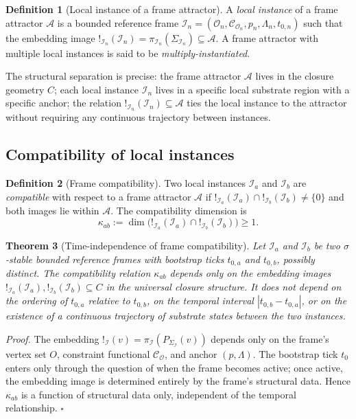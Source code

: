 \documentclass[11pt]{article}
\theoremstyle{plain}
\newtheorem{theorem}{Theorem}[section]
\theoremstyle{definition}
\newtheorem{definition}[theorem]{Definition}
\theoremstyle{remark}
\newcommand{\Ical}{\mathcal{I}}
\newcommand{\Ocal}{\mathcal{O}}
\newcommand{\Ccal}{\mathcal{C}}
\begin{document}
\begin{definition}[Local instance of a frame attractor]\label{def:local-instance}
A \emph{local instance} of a frame attractor $\mathcal{A}$ is a bounded reference frame $\Ical_n = (\Ocal_n, \Ccal_{\Ocal_n}, p_n, \Lambda_n, t_{0,n})$ such that the embedding image $!_{\Ical_n}(\Ical_n) = \pi_{\Ical_n}(\Sigma_{\Ical_n}) \subseteq \mathcal{A}$. A frame attractor with multiple local instances is said to be \emph{multiply-instantiated}.
\end{definition}

The structural separation is precise: the frame attractor $\mathcal{A}$ lives in the closure geometry $C$; each local instance $\Ical_n$ lives in a specific local substrate region with a specific anchor; the relation $!_{\Ical_n}(\Ical_n) \subseteq \mathcal{A}$ ties the local instance to the attractor without requiring any continuous trajectory between instances.

\subsection{Compatibility of local instances}

\begin{definition}[Frame compatibility]\label{def:frame-compatibility}
Two local instances $\Ical_a$ and $\Ical_b$ are \emph{compatible} with respect to a frame attractor $\mathcal{A}$ if $!_{\Ical_a}(\Ical_a) \cap !_{\Ical_b}(\Ical_b) \neq \{0\}$ and both images lie within $\mathcal{A}$. The compatibility dimension is
\[
  \kappa_{ab} := \dim\big( !_{\Ical_a}(\Ical_a) \cap !_{\Ical_b}(\Ical_b) \big) \geq 1.
\]
\end{definition}

\begin{theorem}[Time-independence of frame compatibility]\label{thm:time-independence}
Let $\Ical_a$ and $\Ical_b$ be two $\sigma$-stable bounded reference frames with bootstrap ticks $t_{0,a}$ and $t_{0,b}$, possibly distinct. The compatibility relation $\kappa_{ab}$ depends only on the embedding images $!_{\Ical_a}(\Ical_a), !_{\Ical_b}(\Ical_b) \subseteq C$ in the universal closure structure. It does \emph{not} depend on the ordering of $t_{0,a}$ relative to $t_{0,b}$, on the temporal interval $|t_{0,b} - t_{0,a}|$, or on the existence of a continuous trajectory of substrate states between the two instances.
\end{theorem}

\noindent\emph{Proof.} The embedding $!_\Ical(v) = \pi_\Ical(P_{\Sigma_\Ical}(v))$ depends only on the frame's vertex set $O$, constraint functional $\Ccal_\Ocal$, and anchor $(p, \Lambda)$. The bootstrap tick $t_0$ enters only through the question of when the frame becomes active; once active, the embedding image is determined entirely by the frame's structural data. Hence $\kappa_{ab}$ is a function of structural data only, independent of the temporal relationship. \hfill$\square$
\end{document}
